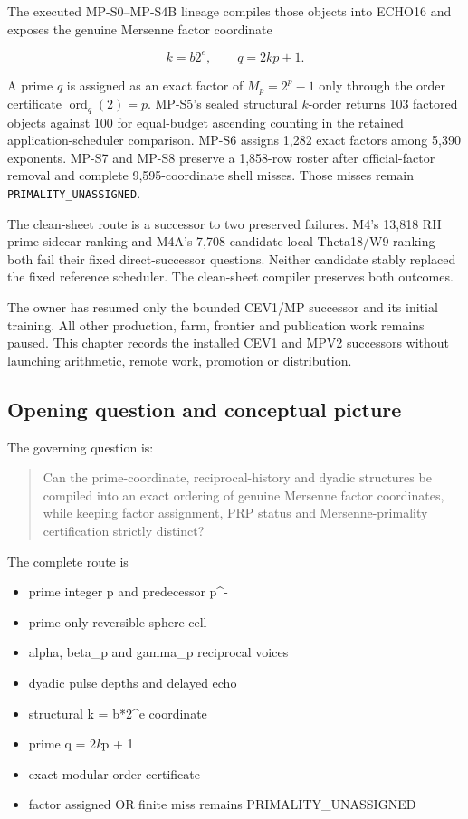 The executed MP-S0--MP-S4B lineage compiles those objects into ECHO16
and exposes the genuine Mersenne factor coordinate

\[
k=b2^e,
\qquad
q=2kp+1.
\]

A prime \(q\) is assigned as an exact factor of \(M_p=2^p-1\) only
through the order certificate \(\operatorname{ord}_q(2)=p\). MP-S5's
sealed structural \(k\)-order returns 103 factored objects against 100
for equal-budget ascending counting in the retained application-scheduler comparison. MP-S6 assigns 1,282 exact factors
among 5,390 exponents. MP-S7 and MP-S8 preserve a 1,858-row roster after
official-factor removal and complete 9,595-coordinate shell misses.
Those misses remain \texttt{PRIMALITY\_UNASSIGNED}.

The clean-sheet route is a successor to two preserved failures. M4's
13,818 RH prime-sidecar ranking and M4A's 7,708 candidate-local
Theta18/W9 ranking both fail their fixed direct-successor questions.
Neither candidate stably replaced the fixed reference scheduler. The clean-sheet compiler preserves both outcomes.

The owner has resumed only the bounded CEV1/MP successor and its initial
training. All other production, farm, frontier and publication work
remains paused. This chapter records the installed CEV1 and MPV2
successors without launching arithmetic, remote work, promotion or
distribution.

\subsection{Opening question and conceptual
picture}\label{viii-ch10-opening-question-and-conceptual-picture}

The governing question is:

\begin{quote}
Can the prime-coordinate, reciprocal-history and dyadic structures be
compiled into an exact ordering of genuine Mersenne factor coordinates,
while keeping factor assignment, PRP status and Mersenne-primality
certification strictly distinct?
\end{quote}

The complete route is

\begin{itemize}
\tightlist
\item
  prime integer p and predecessor p\^{}-
\item
  prime-only reversible sphere cell
\item
  alpha, beta\_p and gamma\_p reciprocal voices
\item
  dyadic pulse depths and delayed echo
\item
  structural k = b*2\^{}e coordinate
\item
  prime q = 2\emph{k}p + 1
\item
  exact modular order certificate
\item
  factor assigned OR finite miss remains PRIMALITY\_UNASSIGNED
\end{itemize}

